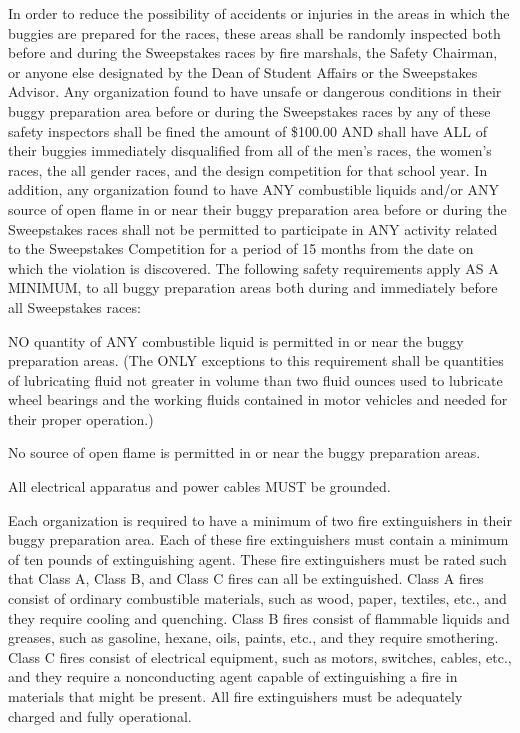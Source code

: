	In order to reduce the possibility of accidents or injuries in the areas in which the buggies are prepared for the races, these areas shall be randomly inspected both before and during the Sweepstakes races by fire marshals, the Safety Chairman, or anyone else designated by the Dean of Student Affairs or the Sweepstakes Advisor. Any organization found to have unsafe or dangerous conditions in their buggy preparation area before or during the Sweepstakes races by any of these safety inspectors shall be fined the amount of \$100.00 AND shall have ALL of their buggies immediately disqualified from all of the men's races, the women's races, the all gender races, and the design competition for that school year. In addition, any organization found to have ANY combustible liquids and/or ANY source of open flame in or near their buggy preparation area before or during the Sweepstakes races shall not be permitted to participate in ANY activity related to the Sweepstakes Competition for a period of 15 months from the date on which the violation is discovered. The following safety requirements apply AS A MINIMUM, to all buggy preparation areas both during and immediately before all Sweepstakes races:

	NO quantity of ANY combustible liquid is permitted in or near the buggy preparation areas. (The ONLY exceptions to this requirement shall be quantities of lubricating fluid not greater in volume than two fluid ounces used to lubricate wheel bearings and the working fluids contained in motor vehicles and needed for their proper operation.)

	No source of open flame is permitted in or near the buggy preparation areas.

	All electrical apparatus and power cables MUST be grounded.

	Each organization is required to have a minimum of two fire extinguishers in their buggy preparation area. Each of these fire extinguishers must contain a minimum of ten pounds of extinguishing agent. These fire extinguishers must be rated such that Class A, Class B, and Class C fires can all be extinguished. Class A fires consist of ordinary combustible materials, such as wood, paper, textiles, etc., and they require cooling and quenching. Class B fires consist of flammable liquids and greases, such as gasoline, hexane, oils, paints, etc., and they require smothering. Class C fires consist of electrical equipment, such as motors, switches, cables, etc., and they require a nonconducting agent capable of extinguishing a fire in materials that might be present. All fire extinguishers must be adequately charged and fully operational.


